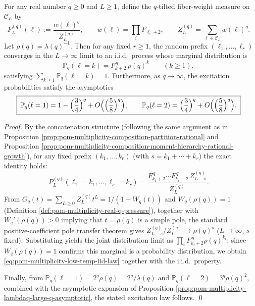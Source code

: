 \begin{proposition}\label{prop:pom-multiplicity-low-temperature-gibbs}
For any real number \(q\ge 0\) and \(L\ge 1\), define the \(q\)-tilted fiber-weight measure on \(\mathcal{C}_L\) by
\[
P^{(q)}_{L}(\boldsymbol{\ell})
:=\frac{w(\boldsymbol{\ell})^{q}}{Z_L^{(q)}},
\qquad
w(\boldsymbol{\ell})=\prod_{i}F_{\ell_i+2},
\qquad
Z_L^{(q)}=\sum_{\boldsymbol{\ell}\in\mathcal{C}_L}w(\boldsymbol{\ell})^{q}.
\]
Let \(\rho(q)=\lambda(q)^{-1}\).
Then for any fixed \(r\ge 1\), the random prefix \((\ell_1,\dots,\ell_r)\) converges in the \(L\to\infty\) limit to an i.i.d.\ process whose marginal distribution is
\begin{equation}\label{eq:pom-multiplicity-low-temp-iid-law}
\boxed{\;
\mathbb{P}_q(\ell=k)=F_{k+2}^{\,q}\,\rho(q)^{k}\qquad(k\ge 1),\;}
\end{equation}
satisfying \(\sum_{k\ge 1}\mathbb{P}_q(\ell=k)=1\).
Furthermore, as \(q\to\infty\), the excitation probabilities satisfy the asymptotics
\[
\boxed{\;
\mathbb{P}_q(\ell=1)=1-\Bigl(\frac34\Bigr)^{q}+O\Bigl(\Bigl(\frac58\Bigr)^{q}\Bigr),\qquad
\mathbb{P}_q(\ell=2)=\Bigl(\frac34\Bigr)^{q}+O\Bigl(\Bigl(\frac58\Bigr)^{q}\Bigr).\;}
\]
\end{proposition}
\begin{proof}
By the concatenation structure (following the same argument as in Proposition \ref{prop:pom-multiplicity-composition-partition-rational} and Proposition \ref{prop:pom-multiplicity-composition-moment-hierarchy-rational-growth}), for any fixed prefix \((k_1,\dots,k_r)\) (with \(s=k_1+\cdots+k_r\)) the exact identity holds:
\[
P^{(q)}_{L}(\ell_1=k_1,\dots,\ell_r=k_r)
=\frac{F_{k_1+2}^{\,q}\cdots F_{k_r+2}^{\,q}\,Z_{L-s}^{(q)}}{Z_{L}^{(q)}}.
\]
From \(G_q(t)=\sum_{L\ge 0}Z_L^{(q)}t^L=1/(1-W_q(t))\) and \(W_q(\rho(q))=1\) (Definition \ref{def:pom-multiplicity-real-q-pressure}), together with
\(
W_q'(\rho(q))>0
\)
implying that \(t=\rho(q)\) is a simple pole, the standard positive-coefficient pole transfer theorem gives
\(
Z_{L-s}^{(q)}/Z_L^{(q)}\to \rho(q)^{s}
\) (\(L\to\infty\), \(s\) fixed).
Substituting yields the joint distribution limit as \(\prod_i F_{k_i+2}^{\,q}\rho(q)^{k_i}\); since \(W_q(\rho(q))=1\) confirms this marginal is a probability distribution, we obtain \eqref{eq:pom-multiplicity-low-temp-iid-law} together with the i.i.d.\ property.
\par
Finally, from \(\mathbb{P}_q(\ell=1)=2^q\rho(q)=2^q/\lambda(q)\) and \(\mathbb{P}_q(\ell=2)=3^q\rho(q)^2\), combined with the asymptotic expansion of Proposition \ref{prop:pom-multiplicity-lambdaq-large-q-asymptotic}, the stated excitation law follows. \qed
\end{proof}

